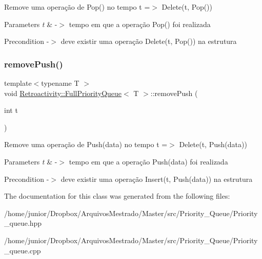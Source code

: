Remove uma operação de Pop() no tempo t =$>$ Delete(t, Pop())


\begin{DoxyParams}{Parameters}
{\em t} & -\/$>$ tempo em que a operação Pop() foi realizada \\
\hline
\end{DoxyParams}
\begin{DoxyPrecond}{Precondition}
-\/$>$ deve existir uma operação Delete(t, Pop()) na estrutura 
\end{DoxyPrecond}
\mbox{\label{classRetroactivity_1_1FullPriorityQueue_ae82e78f6ede64ae31fef741de01d77bb}} 
\subsubsection{\texorpdfstring{remove\+Push()}{removePush()}}
{\footnotesize\ttfamily template$<$typename T $>$ \\
void \hyperlink{classRetroactivity_1_1FullPriorityQueue}{Retroactivity\+::\+Full\+Priority\+Queue}$<$ T $>$\+::remove\+Push (\begin{DoxyParamCaption}\item[{int}]{t }\end{DoxyParamCaption})}

Remove uma operação de Push(data) no tempo t =$>$ Delete(t, Push(data))


\begin{DoxyParams}{Parameters}
{\em t} & -\/$>$ tempo em que a operação Push(data) foi realizada \\
\hline
\end{DoxyParams}
\begin{DoxyPrecond}{Precondition}
-\/$>$ deve existir uma operação Insert(t, Push(data)) na estrutura 
\end{DoxyPrecond}


The documentation for this class was generated from the following files\+:\begin{DoxyCompactItemize}
\item 
/home/junior/\+Dropbox/\+Arquivos\+Mestrado/\+Master/src/\+Priority\+\_\+\+Queue/Priority\+\_\+queue.\+hpp\item 
/home/junior/\+Dropbox/\+Arquivos\+Mestrado/\+Master/src/\+Priority\+\_\+\+Queue/Priority\+\_\+queue.\+cpp\end{DoxyCompactItemize}
